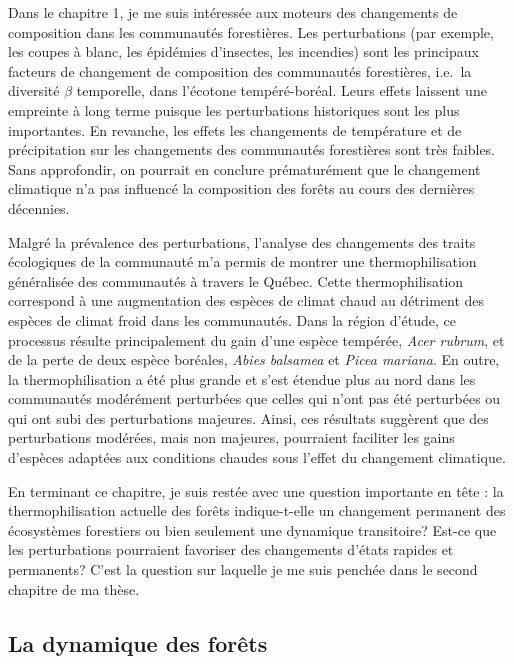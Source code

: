 Dans le chapitre 1, je me suis intéressée aux moteurs des changements de
composition dans les communautés forestières. Les perturbations (par
exemple, les coupes à blanc, les épidémies d'insectes, les incendies)
sont les principaux facteurs de changement de composition des
communautés forestières, i.e.~la diversité \(\beta\) temporelle, dans
l'écotone tempéré-boréal. Leurs effets laissent une empreinte à long
terme puisque les perturbations historiques sont les plus importantes.
En revanche, les effets les changements de température et de
précipitation sur les changements des communautés forestières sont très
faibles. Sans approfondir, on pourrait en conclure prématurément que le
changement climatique n'a pas influencé la composition des forêts au
cours des dernières décennies.

Malgré la prévalence des perturbations, l'analyse des changements des
traits écologiques de la communauté m'a permis de montrer une
thermophilisation généralisée des communautés à travers le Québec. Cette
thermophilisation correspond à une augmentation des espèces de climat
chaud au détriment des espèces de climat froid dans les communautés.
Dans la région d'étude, ce processus résulte principalement du gain
d'une espèce tempérée, \emph{Acer rubrum}, et de la perte de deux espèce
boréales, \emph{Abies balsamea} et \emph{Picea mariana}. En outre, la
thermophilisation a été plus grande et s'est étendue plus au nord dans
les communautés modérément perturbées que celles qui n'ont pas été
perturbées ou qui ont subi des perturbations majeures. Ainsi, ces
résultats suggèrent que des perturbations modérées, mais non majeures,
pourraient faciliter les gains d'espèces adaptées aux conditions chaudes
sous l'effet du changement climatique.

En terminant ce chapitre, je suis restée avec une question importante en
tête : la thermophilisation actuelle des forêts indique-t-elle un
changement permanent des écosystèmes forestiers ou bien seulement une
dynamique transitoire? Est-ce que les perturbations pourraient favoriser
des changements d'états rapides et permanents? C'est la question sur
laquelle je me suis penchée dans le second chapitre de ma thèse.

\hypertarget{la-dynamique-des-foruxeats}{%
\subsection{La dynamique des forêts}\label{la-dynamique-des-foruxeats}}

